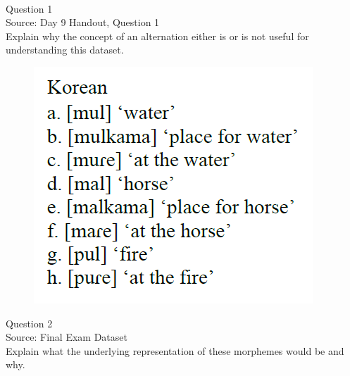 \documentclass[12pt]{article}
\begin{document}
\newpage

\begin{center}
\textbf{{\color{red}{\HUGE END OF EXAM}}}\\

\end{center}
\newpage

\begin{center}
\textbf{{\color{blue}{\HUGE START OF EXAM\\}}}

\textbf{{\color{blue}{\HUGE Student ID: 1715\\}}}

\textbf{{\color{blue}{\HUGE 11:50 AM - 12:10 PM\\}}}

\end{center}
\newpage

{\large Question 1}\\

Source: Day 9 Handout, Question 1\\

Explain why the concept of an alternation either is or is not useful for understanding this dataset.\\

\begin{figure}[H]
\includegraphics{../images/korean.png}
\end{figure}

\newpage

{\large Question 2}\\

Source: Final Exam Dataset\\

Explain what the underlying representation of these morphemes would be and why.\\
\end{document}

